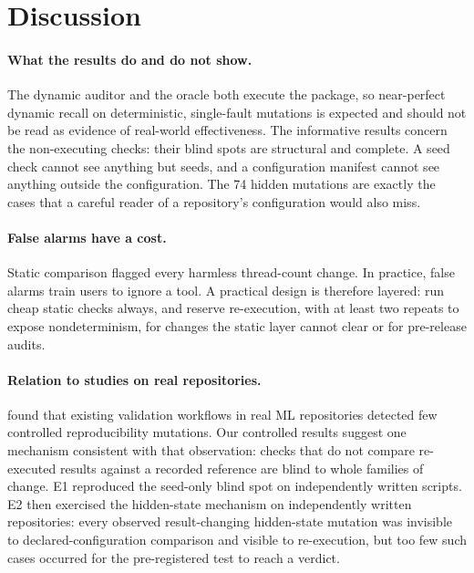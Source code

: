 \documentclass[11pt]{article}
\begin{document}


\section{Discussion}
\label{sec:discussion}

\paragraph{What the results do and do not show.} The dynamic auditor and the oracle both execute the package, so near-perfect dynamic recall on deterministic, single-fault mutations is expected and should not be read as evidence of real-world effectiveness. The informative results concern the non-executing checks: their blind spots are structural and complete. A seed check cannot see anything but seeds, and a configuration manifest cannot see anything outside the configuration. The 74 hidden mutations are exactly the cases that a careful reader of a repository's configuration would also miss.

\paragraph{False alarms have a cost.} Static comparison flagged every harmless thread-count change. In practice, false alarms train users to ignore a tool. A practical design is therefore layered: run cheap static checks always, and reserve re-execution, with at least two repeats to expose nondeterminism, for changes the static layer cannot clear or for pre-release audits.

\paragraph{Relation to studies on real repositories.} \citet{shulepov2026mutation} found that existing validation workflows in real ML repositories detected few controlled reproducibility mutations. Our controlled results suggest one mechanism consistent with that observation: checks that do not compare re-executed results against a recorded reference are blind to whole families of change. E1 reproduced the seed-only blind spot on independently written scripts. E2 then exercised the hidden-state mechanism on independently written repositories: every observed result-changing hidden-state mutation was invisible to declared-configuration comparison and visible to re-execution, but too few such cases occurred for the pre-registered test to reach a verdict.
\end{document}
